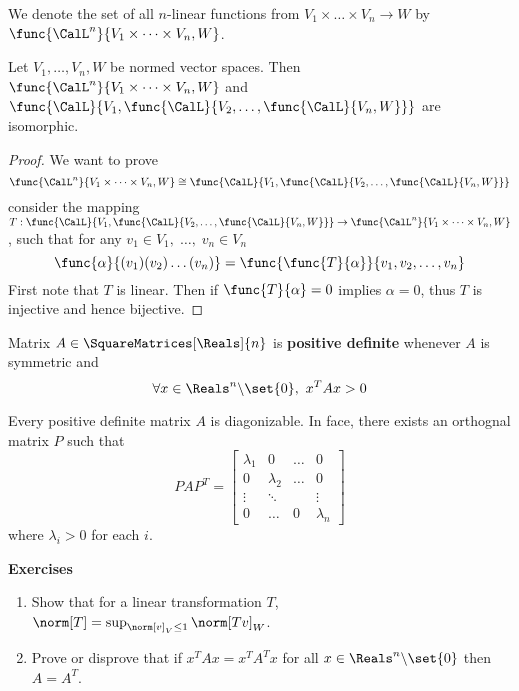 We denote  the set of all \(n\)-linear functions from \(V_1 \times \dots \times V_n \to W\) by \(\func{\CalL^n}{V_1 \times \dots \times V_n, W}\).
\begin{proposition} \label{pr:nLinearIsmorphicLinear}
    Let \(V_1, \dots , V_n, W\) be normed vector spaces. Then \(\func{\CalL^n}{V_1 \times \dots \times V_n, W}\) and \(\func{\CalL}{V_1 , \func{\CalL}{V_2, \dots ,\func{\CalL}{V_n,W}}}\) are isomorphic.
\end{proposition}

\begin{proof}
    We want to prove
    \begin{equation*}
        \func{\CalL^n}{V_1 \times \dots \times V_n, W} \cong \func{\CalL}{V_1 , \func{\CalL}{V_2, \dots ,\func{\CalL}{V_n,W}}}
    \end{equation*}
    consider the mapping \(T : \func{\CalL}{V_1 ,\func{\CalL}{V_2, \dots ,\func{\CalL}{V_n,W}}} \to \func{\CalL^n}{V_1 \times \dots \times V_n, W}\), such that for any \(v_1 \in V_1,\; \dots, \; v_n \in V_n\)
    \begin{equation*}
        \func{\alpha}{(v_1)(v_2) \dots (v_n)} = \func{\func{T}{\alpha}}{v_1,v_2, \dots, v_n}
    \end{equation*}
    First note that \(T\) is linear. Then if \(\func{T}{\alpha} = 0\) implies \(\alpha  = 0\), thus \(T\) is injective and hence bijective.
\end{proof}

\begin{definition}
    Matrix \(A \in \SquareMatrices[\Reals]{n}\) is \textbf{positive definite} whenever \(A\) is symmetric and 
    \begin{equation*}
        \forall x \in \Reals^n \backslash \set{0}, \ x^T A x > 0
    \end{equation*}
\end{definition}

\begin{theorem}
     Every positive definite matrix \(A\) is diagonizable. In face, there exists an orthognal matrix \(P\) such that 
     \begin{equation*}
         PAP^T = \begin{bmatrix}
             \lambda_1 & 0&\dots & 0 \\
             0 & \lambda_2 & \dots & 0\\
             \vdots & \ddots & & \vdots\\
             0 & \dots & 0 & \lambda_n
         \end{bmatrix}
     \end{equation*}
     where \(\lambda_i > 0\) for each \(i\).
\end{theorem}

{\Large\textbf{Exercises}}
\begin{enumerate}
    \item Show that for a linear transformation \(T\), \(\norm[T] = \sup_{\norm[v]_V \leq 1} \norm[Tv]_W\).
    \item Prove or disprove that if \(x^T A x = x^T A^T x\) for all \(x \in \Reals^n \backslash \set{0}\) then \(A = A^T\).
\end{enumerate}
\newpage

